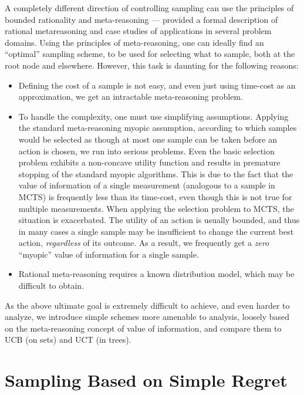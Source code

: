 \documentclass[letterpaper]{article}
\begin{document}
A completely different direction of controlling sampling can use the
principles of bounded rationality \cite{Horvitz.reasoningabout}
and meta-reasoning ---  \cite{Russell.right} provided a formal
description of rational metareasoning and case studies of applications
in several problem domains. Using the principles of meta-reasoning,
one can ideally find an ``optimal'' sampling scheme, to be used
for selecting what to sample, both at the root node \cite{HayRussell.MCTS} and elsewhere.
However, this task is daunting for the following reasons:
\begin{itemize}
\item Defining the cost of a sample is not easy, and even just
  using time-cost as an approximation, we get an intractable
  meta-reasoning problem.
\item To handle the complexity, one must use simplifying assumptions.
      Applying the standard meta-reasoning myopic assumption, according to 
    which samples would be selected as though at most one sample
   can be taken before an action is chosen, we run into serious problems. Even the basic
  selection problem \cite{TolpinShimony.blinkered} exhibits a
  non-concave utility function and results in premature stopping of the
  standard myopic algorithms. This is due to the fact that the value of information of
  a single measurement (analogous to a sample in MCTS) is frequently
  less than its time-cost, even though this is not true for multiple
  measurements.  When applying the selection problem to MCTS, the
  situation is exacerbated.  The utility of an action is usually
  bounded, and thus in many cases a single sample may be insufficient
  to change the current best action, \emph{regardless} of its
  outcome. As a result, we frequently get a \emph{zero} ``myopic''
  value of information for a single sample.
\item Rational meta-reasoning requires a known distribution model, which may be
  difficult to obtain.
\end{itemize}

As the above ultimate goal is extremely difficult
to achieve, and even harder to analyze, we introduce
simple schemes more amenable to analysis, loosely based on the meta-reasoning
concept of value of information, and compare
them to UCB (on sets) and UCT (in trees).

\section{Sampling Based on Simple Regret}
\label{sec:results}
\end{document}
